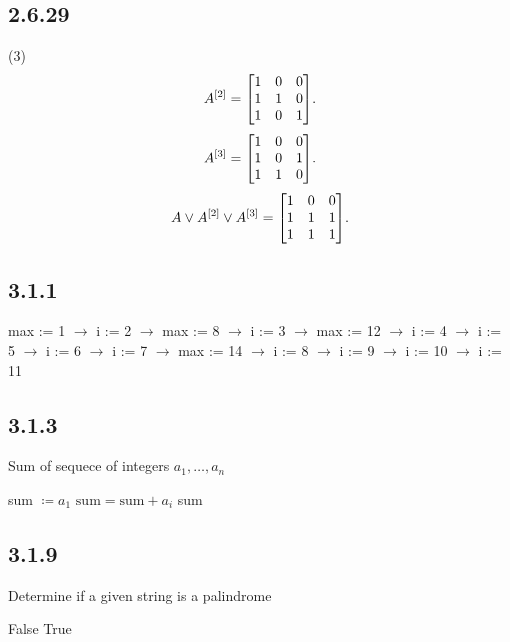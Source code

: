 \documentclass[12pt,titlepage]{extarticle}
\begin{document}
\subsection*{2.6.29}
\begin{tasks}(3)
    \task
    \[
        A^{[2]} = \mqty[
        1 & 0 & 0 \\
        1 & 1 & 0 \\
        1 & 0 & 1
        ]
    .\]
    \task
    \[
        A^{[3]} = \mqty[
        1 & 0 & 0 \\
        1 & 0 & 1 \\
        1 & 1 & 0
        ]
    .\]
    \task
    \[
        A \lor A^{[2]} \lor A^{[3]} = \mqty[
        1 & 0 & 0 \\
        1 & 1 & 1 \\
        1 & 1 & 1
        ]
    .\]
\end{tasks}

\subsection*{3.1.1}
max := 1 $\to$
i := 2 $\to$
max := 8 $\to$
i := 3 $\to$
max := 12 $\to$
i := 4 $\to$
i := 5 $\to$
i := 6 $\to$
i := 7 $\to$
max := 14 $\to$
i := 8 $\to$
i := 9 $\to$
i := 10 $\to$
i := 11

\subsection*{3.1.3}
\begin{algorithm}[H]
    \caption{Sum of sequece of integers $a_1, \ldots, a_n$}
    \begin{algorithmic}[1]
            \State sum $\coloneq a_1$
                \State $\text{sum} = \text{sum} + a_i$
            \EndFor
            \State\Return sum
        \EndFunction
    \end{algorithmic}
\end{algorithm}

\subsection*{3.1.9}
\begin{algorithm}[H]
    \caption{Determine if a given string is a palindrome}
    \begin{algorithmic}[1]
                \State \Return False
            \EndIf
            \EndFor
            \State\Return True
        \EndFunction
    \end{algorithmic}
\end{algorithm}
\end{document}
